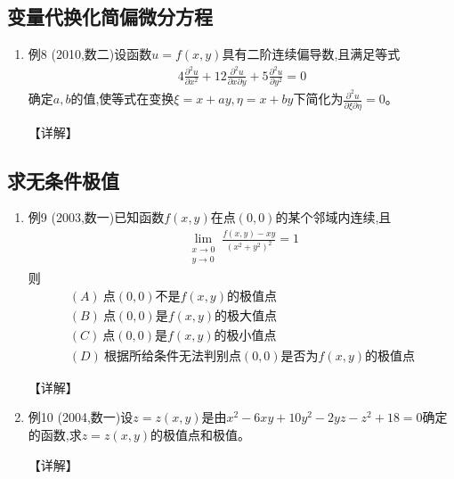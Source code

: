 \documentclass[12pt, a4paper, oneside, UTF8]{ctexbook}
\begin{document}
\subsection{变量代换化简偏微分方程}

\begin{enumerate}[label=\arabic*.,start=8]
    \item 例8 (2010,数二)设函数$u=f(x,y)$具有二阶连续偏导数,且满足等式
    \begin{align*}
        4\frac{\partial^2 u}{\partial x^2}+12\frac{\partial^2 u}{\partial x\partial y}+5\frac{\partial^2 u}{\partial y^2}=0
    \end{align*}
    确定$a,b$的值,使等式在变换$\xi=x+ay,\eta=x+by$下简化为$\frac{\partial^2 u}{\partial \xi\partial \eta}=0$。
    
    \begin{solution}
    【详解】
    \end{solution}
\end{enumerate}

\subsection{求无条件极值}

\begin{enumerate}[label=\arabic*.,start=9]
    \item 例9 (2003,数一)已知函数$f(x,y)$在点$(0,0)$的某个邻域内连续,且
    \begin{align*}
        \lim_{\substack{x\to 0\\ y\to 0}}\frac{f(x,y)-xy}{(x^2+y^2)^2}=1
    \end{align*}
    则
    \begin{align*}
        (A)\ \text{点}(0,0)\text{不是}f(x,y)\text{的极值点} \\
        (B)\ \text{点}(0,0)\text{是}f(x,y)\text{的极大值点} \\
        (C)\ \text{点}(0,0)\text{是}f(x,y)\text{的极小值点} \\
        (D)\ \text{根据所给条件无法判别点}(0,0)\text{是否为}f(x,y)\text{的极值点}
    \end{align*}
    
    \begin{solution}
    【详解】
    \end{solution}
    
    \item 例10 (2004,数一)设$z=z(x,y)$是由$x^2-6xy+10y^2-2yz-z^2+18=0$确定的函数,求$z=z(x,y)$的极值点和极值。
    
    \begin{solution}
    【详解】
    \end{solution}
\end{enumerate}
\end{document}
